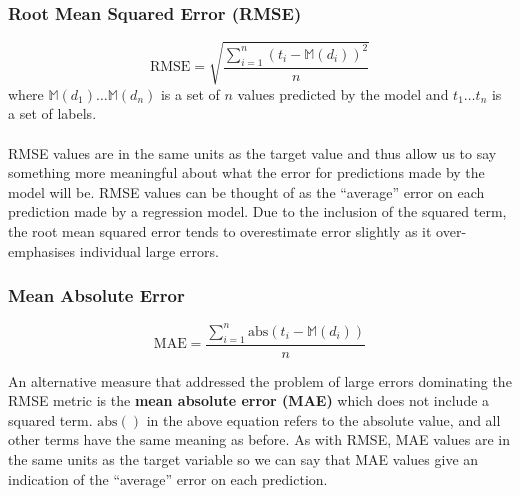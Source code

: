 \documentclass[a4paper,11pt]{article}
\begin{document}
\subsubsection{Root Mean Squared Error (RMSE)}
\[
    \text{RMSE} = \sqrt{ \frac{\sum^n_{i=1} \left( t_i - \mathbb{M}(d_i) \right)^2 }{n} }
\]
where $\mathbb{M}(d_1) \dots \mathbb{M}(d_n)$ is a set of $n$ values predicted by the model and $t_1 \dots t_n$ is a set of labels.
\\\\
RMSE values are in the same units as the target value and thus allow us to say something more meaningful about what the error for predictions made by the model will be.
RMSE values can be thought of as the ``average'' error on each prediction made by a regression model.
Due to the inclusion of the squared term, the root mean squared error tends to overestimate error slightly as it over-emphasises individual large errors.

\subsubsection{Mean Absolute Error}
\[
    \text{MAE} = \frac{ \sum^n_{i=1} \text{abs} \left( t_i - \mathbb{M}(d_i) \right)}{n}
\]

An alternative measure that addressed the problem of large errors dominating the RMSE metric is the \textbf{mean absolute error (MAE)} which does not include a squared term.
$\text{abs}()$ in the above equation refers to the absolute value, and all other terms have the same meaning as before.
As with RMSE, MAE values are in the same units as the target variable so we can say that MAE values give an indication of the ``average'' error on each prediction.
\end{document}
